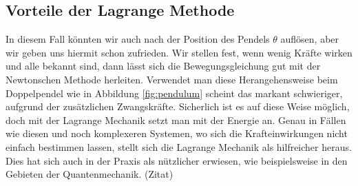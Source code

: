 \subsection{Vorteile der Lagrange Methode}
In diesem Fall könnten wir auch nach der Position des Pendels \(\theta\) auflösen,
aber wir geben uns hiermit schon zufrieden.
Wir stellen fest, wenn wenig Kräfte wirken und alle bekannt sind,
dann lässt sich die Bewegungsgleichung gut mit der Newtonschen Methode herleiten.
Verwendet man diese Herangehensweise beim Doppelpendel wie in Abbildung \ref{fig:pendulum}
scheint das markant schwieriger, aufgrund der zusätzlichen Zwangskräfte.
Sicherlich ist es auf diese Weise möglich, doch mit der Lagrange Mechanik setzt man mit der Energie an.
Genau in Fällen wie diesen und noch komplexeren Systemen, wo sich die Krafteinwirkungen nicht einfach
bestimmen lassen, stellt sich die Lagrange Mechanik als hilfreicher heraus.
Dies hat sich auch in der Praxis als nützlicher erwiesen, wie beispielsweise 
in den Gebieten der Quantenmechanik. (Zitat)
